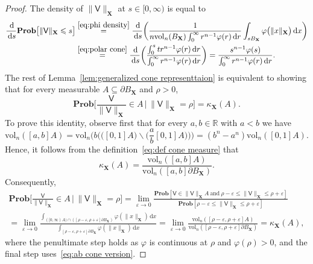 \documentclass[11pt,reqno]{amsart}
\renewcommand{\le}{\leqslant}
\renewcommand{\setminus}{\smallsetminus}
\newcommand{\ud}[0]{\,\mathrm{d}}
\newcommand{\X}{\mathbf X}
\newcommand{\f}{\varphi}
\newcommand{\e}{\varepsilon}
\newcommand{\R}{\mathbb R}
\theoremstyle{remark}
\renewcommand{\subset}{\subseteq}
\renewcommand{\Pr}{\mathbf{Prob}}
\newcommand{\vol}{\mathrm{vol}}
\renewcommand{\1}{\mathbf 1}
\newcommand{\V}{\mathsf{V}}
\begin{document}
\begin{proof} The density of $\|\V\|_{\X}$ at $s\in [0,\infty)$ is equal to
\begin{align*}
\frac{\ud}{\ud s}\Pr \big[\|\V\|_{\X}\le s\big]& \stackrel{\eqref{eq:phi density}}{=} \frac{\ud}{\ud s}\bigg(\frac{1}{n\vol_n(B_{\X})\int_0^\infty r^{n-1}\f(r)\ud r}\int_{sB_{\X}} \f\big(\|x\|_{\X}\big)\ud x\bigg)\\&\stackrel{\eqref{eq:polar cone}}{=} \frac{\ud}{\ud s}\bigg( \frac{\int_0^st r^{n-1}\f(r)\ud r}{\int_0^\infty r^{n-1}\f(r)\ud r}\bigg)= \frac{s^{n-1}\f(s)}{\int_0^\infty r^{n-1}\f(r)\ud r}.
\end{align*}
The rest of Lemma~\ref{lem:generalized cone representtaion} is equivalent to showing that for every measurable $A\subset \partial B_{\X}$  and $\rho>0$,
$$
\Pr\bigg[\frac{\V}{\|\V\|_{\X}}\in A \,\Big|\, \|\V\|_{\X}=\rho\bigg]=\kappa_{\X}(A).
$$
To prove this identity, observe first that for every $a,b\in \R$ with $a<b$ we have
$$
\vol_n([a,b]A)=\vol_n \bigg(b\Big(\big([0,1]A\big)\setminus \big(\frac{a}{b}[0,1]A\big)\Big)\bigg)=(b^n-a^n)\vol_n([0,1]A).
$$
Hence, it follows from the definition~\eqref{eq:def cone measure} that
\begin{equation}\label{eq:ab cone version}
\kappa_{\X}(A)=\frac{\vol_n([a,b]A)}{\vol_n([a,b]\partial B_{\X})}.
\end{equation}
Consequently,
\begin{multline*}
\Pr\bigg[\frac{\V}{\|\V\|_{\X}}\in A \,\Big|\, \|\V\|_{\X}=\rho\bigg]=\lim_{\e\to 0}\frac{\Pr[\V\in \|\V\|_{\X} A\ \mathrm{and}\ \rho-\e\le \|\V\|_{\X}\le \rho+\e]}{\Pr[\rho-\e\le \|\V\|_{\X}\le \rho+\e]}\\
 =\lim_{\e\to 0} \frac{\int_{([0,\infty)A)\cap ([\rho-\e,\rho+\e]\partial B_{\X})}\f(\|x\|_{\X})\ud x}{\int_{[\rho-\e,\rho+\e]\partial B_{\X}}\f(\|x\|_{\X})\ud x}=\lim_{\e\to 0} \frac{\vol_n([\rho-\e,\rho+\e]A)}{\vol_n([\rho-\e,\rho+\e]\partial B_{\X})}=\kappa_{\X}(A),
 \end{multline*}
where the penultimate step holds as $\f$ is continuous at $\rho$ and $\f(\rho)>0$, and the final step uses~\eqref{eq:ab cone version}.
\end{proof}
\end{document}
